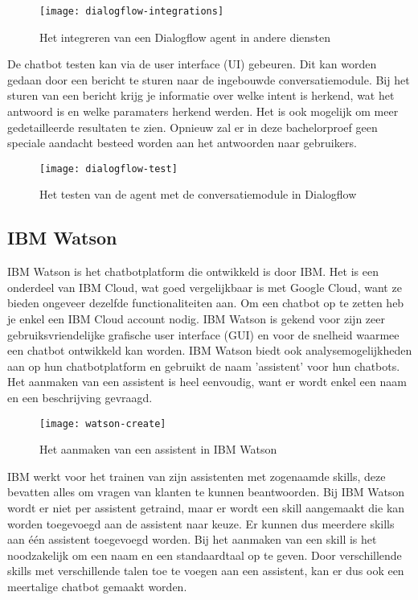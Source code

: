 \begin{figure}[H]
    \label{fig:dialogflow-integrations}
    \centering
    \texttt{[image: dialogflow-integrations]}
    \caption{Het integreren van een Dialogflow agent in andere diensten}
\end{figure}

De chatbot testen kan via de user interface (UI) gebeuren. Dit kan worden gedaan door een bericht te sturen naar de ingebouwde conversatiemodule. Bij het sturen van een bericht krijg je informatie over welke intent is herkend, wat het antwoord is en welke paramaters herkend werden. Het is ook mogelijk om meer gedetailleerde resultaten te zien. Opnieuw zal er in deze bachelorproef geen speciale aandacht besteed worden aan het antwoorden naar gebruikers.

\begin{figure}[H]
    \label{fig:dialogflow-test}
    \centering
    \texttt{[image: dialogflow-test]}
    \caption{Het testen van de agent met de conversatiemodule in Dialogflow}
\end{figure}

\subsection{IBM Watson}
\label{subsec:werking-platformen-ibm-watson}

IBM Watson is het chatbotplatform die ontwikkeld is door IBM. Het is een onderdeel van IBM Cloud, wat goed vergelijkbaar is met Google Cloud, want ze bieden ongeveer dezelfde functionaliteiten aan. Om een chatbot op te zetten heb je enkel een IBM Cloud account nodig. IBM Watson is gekend voor zijn zeer gebruiksvriendelijke grafische user interface (GUI) en voor de snelheid waarmee een chatbot ontwikkeld kan worden. IBM Watson biedt ook analysemogelijkheden aan op hun chatbotplatform en gebruikt de naam 'assistent' voor hun chatbots. Het aanmaken van een assistent is heel eenvoudig, want er wordt enkel een naam en een beschrijving gevraagd.

\begin{figure}[H]
    \label{fig:watson-create}
    \centering
    \texttt{[image: watson-create]}
    \caption{Het aanmaken van een assistent in IBM Watson}
\end{figure}

IBM werkt voor het trainen van zijn assistenten met zogenaamde skills, deze bevatten alles om vragen van klanten te kunnen beantwoorden. Bij IBM Watson wordt er niet per assistent getraind, maar er wordt een skill aangemaakt die kan worden toegevoegd aan de assistent naar keuze. Er kunnen dus meerdere skills aan één assistent toegevoegd worden. Bij het aanmaken van een skill is het noodzakelijk om een naam en een standaardtaal op te geven. Door verschillende skills met verschillende talen toe te voegen aan een assistent, kan er dus ook een meertalige chatbot gemaakt worden.

